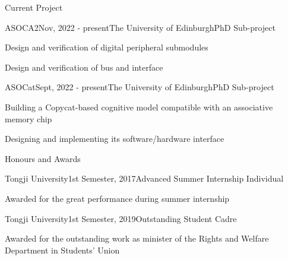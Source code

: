 \documentclass{resume} %
\begin{document}
\begin{rSection}{Current Project}
	
	\begin{rSubsection}{ASOCA2}{Nov, 2022 - present}{The University of Edinburgh}{PhD Sub-project}
		\item Design and verification of digital peripheral submodules
		\item Design and verification of bus and interface
	\end{rSubsection}
	
	\begin{rSubsection}{ASOCat}{Sept, 2022 - present}{The University of Edinburgh}{PhD Sub-project}
		\item Building a Copycat-based cognitive model compatible with an associative memory chip
		\item Designing and implementing its software/hardware interface
	\end{rSubsection}

\end{rSection}

\begin{rSection}{Honours and Awards}
	
	\begin{rSubsection}{Tongji University}{1st Semester, 2017}{Advanced Summer Internship Individual}{}
		\item Awarded for the great performance during summer internship
	\end{rSubsection}
		
	\begin{rSubsection}{Tongji University}{1st Semester, 2019}{Outstanding Student Cadre}{}
		\item Awarded for the outstanding work as minister of the Rights and Welfare Department in Students' Union
	\end{rSubsection}

\end{rSection}
\end{document}
